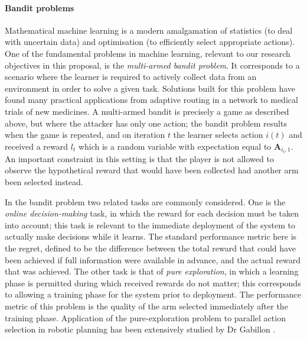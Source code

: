 \paragraph{Bandit problems}
Mathematical machine learning is a modern amalgamation of statistics (to deal with uncertain data) and optimisation (to efficiently select appropriate actions).   	
One of the fundamental problems in machine learning, relevant to our research objectives in this proposal, is the \textit{multi-armed bandit problem}. It corresponds to a scenario where the learner is required to actively collect data from an environment in order to solve a given task. Solutions built for this problem have found many practical applications from adaptive routing in a network to medical trials of new medicines\cite{bubeck2012regret}.
A multi-armed bandit is precisely a game as described above, but where the attacker has only one action; the bandit problem results when the game is repeated, and on iteration $t$ the learner selects action $i(t)$ and received a reward $l_t$ which is a random variable with expectation equal to $\boldsymbol A_{i_t,1}$.
An important constraint in this setting is that the player is not allowed to observe the hypothetical reward that would have been collected had another arm been selected instead.

In the bandit problem two related tasks are commonly considered.  One is the {\em online decision-making} task, in which the reward for each decision must be taken into account; this task is relevant to the immediate deployment of the system to actually make decisions while it learns.  The standard performance metric here is the regret, defined to be the difference between the total reward that could have been achieved if full information were available in advance, and the actual reward that was achieved.  The other task is that of {\em pure exploration}, in which a learning phase is permitted during which received rewards do not matter; this corresponds to allowing a training phase for the system prior to deployment.  The performance metric of this problem is the quality of the arm selected immediately after the training phase.  Application of the pure-exploration problem to parallel action selection in robotic planning has been extensively studied by Dr Gabillon \cite{Gabillon11MB}. 

